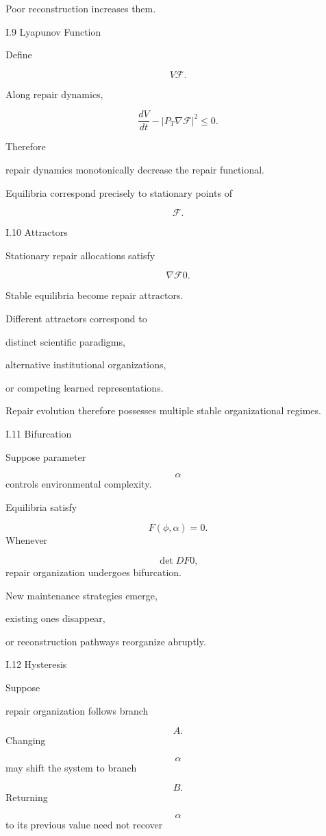 \documentclass[12pt,oneside]{article}
\theoremstyle{plain}
\theoremstyle{definition}
\theoremstyle{remark}
\begin{document}
Poor reconstruction increases them.


I.9 Lyapunov Function

Define

\[
V
\mathcal F.
\]

Along repair dynamics,

\[
\frac{dV}{dt}
- 

|
P_T
\nabla
\mathcal F
|^2
\le0.
\]

Therefore

repair dynamics monotonically decrease the repair functional.

Equilibria correspond precisely to stationary points of

\[
\mathcal F.
\]

I.10 Attractors

Stationary repair allocations satisfy

\[
\nabla
\mathcal F
0. 

\]

Stable equilibria become repair attractors.

Different attractors correspond to

distinct scientific paradigms,

alternative institutional organizations,

or competing learned representations.

Repair evolution therefore possesses multiple stable organizational regimes.


I.11 Bifurcation

Suppose parameter

\[
\alpha
\]
controls environmental complexity.

Equilibria satisfy

\[
F(\phi,\alpha)=0.
\]
Whenever

\[
\det
DF
0,
\]
repair organization undergoes bifurcation.

New maintenance strategies emerge,

existing ones disappear,

or reconstruction pathways reorganize abruptly.


I.12 Hysteresis

Suppose

repair organization follows branch

\[
A.
\]
Changing

\[
\alpha
\]
may shift the system to branch

\[
B.
\]
Returning

\[
\alpha
\]
to its previous value need not recover
\end{document}
